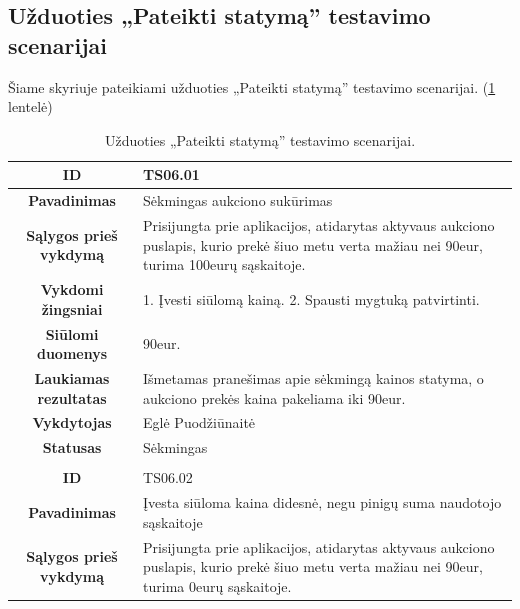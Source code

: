 \documentclass{VUMIFPSkursinis}
\begin{document}
		\subsection{Užduoties „Pateikti statymą” testavimo scenarijai}
	Šiame skyriuje pateikiami užduoties „Pateikti statymą” testavimo scenarijai. (\ref{statymas} lentelė)
	\begin{table}[H]
		\caption{Užduoties „Pateikti statymą” testavimo scenarijai.}
		\begin{tabular}{|p{6cm}|p{11cm}|}
			\hline
			\multicolumn{1}{|c|}{{\bfseries ID}}&
			{TS06.01}\\
			\hline
			\multicolumn{1}{|c|}{{\bfseries Pavadinimas}}&
			{Sėkmingas aukciono sukūrimas}\\
			\hline
			\multicolumn{1}{|c|}{{\bfseries Sąlygos prieš vykdymą}}&
			{Prisijungta prie aplikacijos, atidarytas aktyvaus aukciono puslapis, kurio prekė šiuo metu verta mažiau nei 90eur, turima 100eurų sąskaitoje.}\\
			\hline
			\multicolumn{1}{|c|}{{\bfseries Vykdomi žingsniai}}&
			{1. Įvesti siūlomą kainą.
			2. Spausti mygtuką patvirtinti.}\\
			\hline
			\multicolumn{1}{|c|}{{\bfseries Siūlomi duomenys}}&
			{90eur.}\\
			\hline
			\multicolumn{1}{|c|}{{\bfseries Laukiamas rezultatas}}&
			{Išmetamas pranešimas apie sėkmingą kainos statyma, o aukciono prekės kaina pakeliama iki 90eur.}\\
			\hline
			\multicolumn{1}{|c|}{{\bfseries Vykdytojas}}&
			{Eglė Puodžiūnaitė}\\
			\hline
			\multicolumn{1}{|c|}{{\bfseries Statusas}}&
			{Sėkmingas}\\
			\hline
			\rowcolor{lightgray}
			\multicolumn{2}{|c|}{}\\
			\hline
			\multicolumn{1}{|c|}{{\bfseries ID}}&
			{TS06.02}\\
			\hline
			\multicolumn{1}{|c|}{{\bfseries Pavadinimas}}&
			{Įvesta siūloma kaina didesnė, negu pinigų suma naudotojo sąskaitoje}\\
			\hline
			\multicolumn{1}{|c|}{{\bfseries Sąlygos prieš vykdymą}}&
			{Prisijungta prie aplikacijos, atidarytas aktyvaus aukciono puslapis, kurio prekė šiuo metu verta mažiau nei 90eur, turima 0eurų sąskaitoje.}\\
			\hline
		\end{tabular}
		\label{statymas}
	\end{table}	
\end{document}
